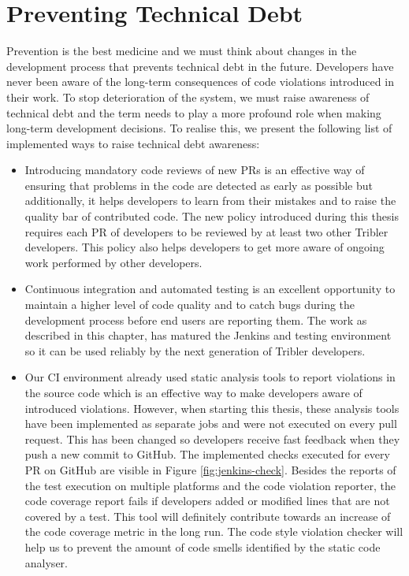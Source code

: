 \section{Preventing Technical Debt}
Prevention is the best medicine and we must think about changes in the development process that prevents technical debt in the future. Developers have never been aware of the long-term consequences of code violations introduced in their work. To stop deterioration of the system, we must raise awareness of technical debt and the term needs to play a more profound role when making long-term development decisions. To realise this, we present the following list of implemented ways to raise technical debt awareness:
\begin{itemize}
	\item Introducing mandatory code reviews of new PRs is an effective way of ensuring that problems in the code are detected as early as possible\cite{18fpreventdebt} but additionally, it helps developers to learn from their mistakes and to raise the quality bar of contributed code. The new policy introduced during this thesis requires each PR of developers to be reviewed by at least two other Tribler developers. This policy also helps developers to get more aware of ongoing work performed by other developers.
	\item Continuous integration and automated testing is an excellent opportunity to maintain a higher level of code quality and to catch bugs during the development process before end users are reporting them. The work as described in this chapter, has matured the Jenkins and testing environment so it can be used reliably by the next generation of Tribler developers.
	\item Our CI environment already used static analysis tools to report violations in the source code which is an effective way to make developers aware of introduced violations\cite{nagappan2005static}. However, when starting this thesis, these analysis tools have been implemented as separate jobs and were not executed on every pull request. This has been changed so developers receive fast feedback when they push a new commit to GitHub. The implemented checks executed for every PR on GitHub are visible in Figure \ref{fig:jenkins-check}. Besides the reports of the test execution on multiple platforms and the code violation reporter, the code coverage report fails if developers added or modified lines that are not covered by a test. This tool will definitely contribute towards an increase of the code coverage metric in the long run. The code style violation checker will help us to prevent the amount of code smells identified by the static code analyser.
\end{itemize}

